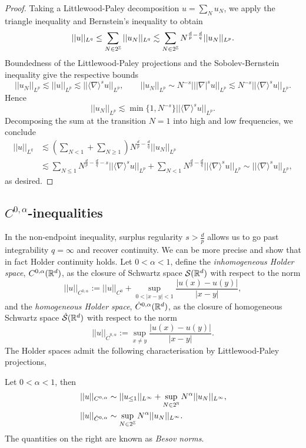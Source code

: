 \begin{proof}
	Taking a Littlewood-Paley decomposition $u = \sum_N u_N$, we apply the triangle inequality and Bernstein's inequality to obtain
		\[ ||u||_{L^q} \leq \sum_{N \in 2^\mathbb Z} ||u_N||_{L^q} \lesssim \sum_{N \in 2^\mathbb Z} N^{\frac{d}{p} - \frac{d}{q}} ||u_N||_{L^p}. \]
	Boundedness of the Littlewood-Paley projections and the Sobolev-Bernstein inequality give the respective bounds	
		\[ ||u_N||_{L^p} \lesssim ||u||_{L^p} \lesssim || \langle \nabla \rangle^s u||_{L^p}, \qquad ||u_N||_{L^p} \sim N^{-s} |||\nabla|^s u||_{L^p}\lesssim N^{-s} || \langle \nabla \rangle^s u||_{L^p}. \]
	Hence
		\[ ||u_N||_{L^p} \lesssim \min\{ 1, N^{-s} \} || \langle \nabla \rangle^s u||_{L^p}.\]
	Decomposing the sum at the transition $N = 1$ into high and low frequencies, we conclude
		\begin{align*}
			 ||u||_{L^q} 
			 	&\lesssim \left( \sum_{N < 1} + \sum_{N \geq 1} \right) N^{\frac{d}{p} - \frac{d}{q}} ||u_N||_{L^p} \\
			 	&\lesssim \sum_{N \leq 1} N^{\frac{d}{p} - \frac{d}{q} -s} || \langle \nabla \rangle^s u||_{L^p} +  \sum_{N < 1} N^{\frac{d}{p} - \frac{d}{q}} || \langle \nabla \rangle^s u||_{L^p} \sim || \langle \nabla \rangle^s u||_{L^p},
		\end{align*}	 
	as desired. 	
\end{proof}

\subsection{$C^{0, \alpha}$-inequalities}

In the non-endpoint inequality, surplus regularity $s > \tfrac{d}{p}$ allows us to go past integrability $q = \infty$ and recover continuity. We can be more precise and show that in fact Holder continuity holds. Let $0 < \alpha < 1$, define the \emph{inhomogeneous Holder space}, $C^{0, \alpha} (\mathbb R^d)$, as the closure of Schwartz space $\mathcal S (\mathbb R^d)$ with respect to the norm 
	\[ ||u||_{C^{0, \alpha}} := ||u||_{C^0} + \sup_{0 < |x - y| < 1} \frac{|u(x) - u(y)|}{|x - y|} ,\]
and the \emph{homogeneous Holder space}, $\dot C^{0, \alpha} (\mathbb R^d)$, as the closure of homogeneous Schwartz space $\dot {\mathcal S} (\mathbb R^d)$ with respect to the norm 
	\[ ||u||_{\dot C^{0, \alpha}} := \sup_{x \neq y} \frac{|u(x) - u(y)|}{|x - y|} .\]
The Holder spaces admit the following characterisation by Littlewood-Paley projections,


\begin{proposition}
	Let $0 < \alpha < 1$, then 
		\begin{align*}
			 ||u||_{C^{0, \alpha}}
			 	&\sim ||u_{\leq 1}||_{L^\infty} + \sup_{N \in 2^\mathbb N} N^\alpha ||u_N||_{L^\infty},
			 \\
			 ||u||_{\dot C^{0, \alpha}}
			 	&\sim \sup_{N \in 2^\mathbb Z} N^\alpha ||u_N||_{L^\infty}.
		\end{align*}
	The quantities on the right are known as \emph{Besov norms}. 
\end{proposition}

